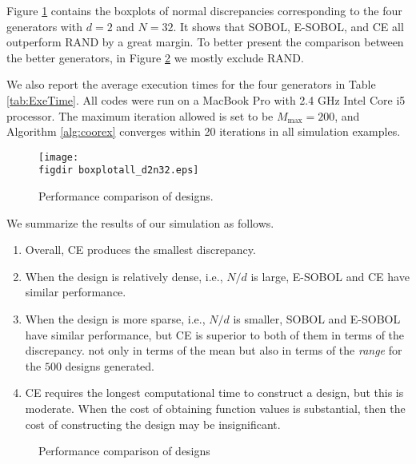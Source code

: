 \documentclass[graybox]{svmult}
\newcommand{\figdir}{code/} %
\begin{document}
Figure \ref{fig:SOBOLVsRAND} contains the boxplots of normal discrepancies corresponding to the four generators with $d=2$ and $N=32$. It shows that SOBOL, E-SOBOL, and CE all outperform RAND by a great margin. To better present the comparison between the better generators, in Figure \ref{fig:comparison} we mostly exclude RAND.

We also report the average execution times for the four generators in Table \ref{tab:ExeTime}. All codes were run on a MacBook Pro with 2.4 GHz Intel Core i5 processor. The maximum iteration allowed is set to be $M_{\max} = 200$, and  Algorithm \ref{alg:coorex} converges within 20 iterations in all simulation examples.


\begin{figure}[ht]
\begin{center}
\texttt{[image: \\figdir boxplotall\_d2n32.eps]}
\caption{Performance comparison of designs. \label{fig:SOBOLVsRAND}}
\end{center}
\end{figure}

 We summarize the results of our simulation as follows. 
\begin{enumerate}
\item
Overall, CE produces the smallest discrepancy.
\item 
When the design is relatively dense, i.e., $N/d$ is large, E-SOBOL and CE have similar performance.
\item
When the design is more sparse, i.e., $N/d$ is smaller, SOBOL and E-SOBOL have similar performance, but CE is superior to both of them in terms of the discrepancy. not only in terms of the mean but also in terms of the \emph{range} for the $500$ designs generated.

\item CE requires the longest computational time to construct a design, but this is moderate.  When the cost of obtaining function values is substantial, then the cost of constructing the design may be insignificant.  
\end{enumerate}

\begin{figure}[ht]
\centering
{}
\quad
{}
\quad
{}
\quad
{}
\quad
{}
\quad
{}
\caption{Performance comparison of designs \label{fig:comparison}}
\end{figure}
\end{document}
